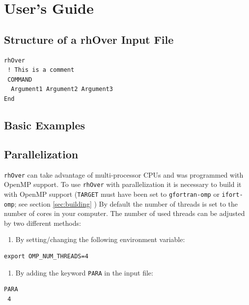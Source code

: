 \documentclass[11pt]{article}
\begin{document}
\clearpage
\section{User's Guide}

\subsection{Structure of a rhOver Input File}

\begin{lstlisting}[frame=single]
rhOver 
 ! This is a comment
 COMMAND
  Argument1 Argument2 Argument3 
End
\end{lstlisting}

\subsection{Basic Examples}

\subsection{Parallelization}

\texttt{rhOver} can take advantage of multi-processor CPUs and was programmed with OpenMP support. 
To use \texttt{rhOver} with parallelization it is necessary to build it with OpenMP support (\texttt{TARGET} must have been set to \texttt{gfortran-omp} or \texttt{ifort-omp}; see section \ref{sec:building} )
By default the number of threads is set to the number of cores in your computer. The number of used threads can be adjusted by two different methods:

\begin{enumerate}[start=1]
 \item By setting/changing the following environment variable: 
\end{enumerate}

\begin{lstlisting}[frame=single,backgroundcolor=\color{bash}]
export OMP_NUM_THREADS=4
\end{lstlisting}

\begin{enumerate}[start=2]
 \item By adding the keyword \texttt{PARA} in the input file: 
\end{enumerate}

\begin{lstlisting}[frame=single]
PARA 
 4
\end{lstlisting}
\end{document}
